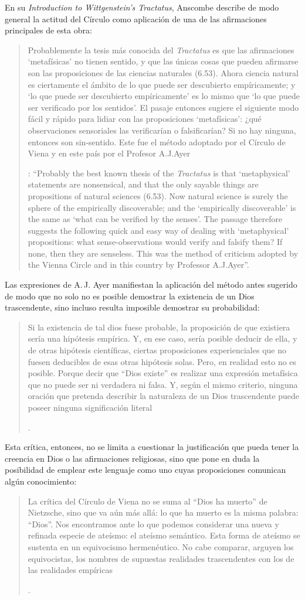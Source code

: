 En su \emph{Introduction to Wittgenstein's Tractatus}, Anscombe describe de modo general la actitud del Círculo como aplicación de una de las afirmaciones principales de esta obra: \blockquote[{\Cite[150]{anscombe1959iwt}}: \enquote{Probably the best known thesis of the \emph{Tractatus} is that `metaphysical' statements are nonsensical, and that the only sayable things are propositions of natural sciences (6.53). Now natural science is surely the sphere of the empirically discoverable; and the `empirically discoverable' is the same as `what can be verified by the senses'. The passage therefore suggests the following quick and easy way of dealing with `metaphysical' propositions: what sense-observations would verify and falsify them? If none, then they are senseless. This was the method of criticism adopted by the Vienna Circle and in this country by Professor A.J.Ayer}.]{Probablemente la tesis más conocida del \emph{Tractatus} es que las afirmaciones `metafísicas' no tienen sentido, y que las únicas cosas que pueden afirmarse son las proposiciones de las ciencias naturales (6.53). Ahora ciencia natural es ciertamente el ámbito de lo que puede ser descubierto empíricamente; y `lo que puede ser descubierto empíricamente' es lo mismo que `lo que puede ser verificado por los sentidos'. El pasaje entonces sugiere el siguiente modo fácil y rápido para lidiar con las proposiciones `metafísicas': ¿qué observaciones sensoriales las verificarían o falsificarían? Si no hay ninguna, entonces son sin-sentido. Este fue el método adoptado por el Círculo de Viena y en este país por el Profesor A.J.Ayer}.

Las expresiones de A.\,J. Ayer manifiestan la aplicación del método antes sugerido de modo que no solo no es posible demostrar la existencia de un Dios trascendente, sino incluso resulta imposible demostrar su probabilidad: \blockquote[{\Cite[Cf.][155]{dominguez2009at}}.]{Si la existencia de tal dios fuese probable, la proposición de que existiera sería una hipótesis empírica. Y, en ese caso, sería posible deducir de ella, y de otras hipótesis científicas, ciertas proposiciones experienciales que no fuesen deducibles de esas otras hipótesis solas. Pero, en realidad esto no es posible. \textelp{} Porque decir que ``Dios existe'' es realizar una expresión metafísica que no puede ser ni verdadera ni falsa. Y, según el mismo criterio, ninguna oración que pretenda describir la naturaleza de un Dios trascendente puede poseer ninguna significación literal}. Esta crítica, entonces, no se limita a cuestionar la justificación que pueda tener la creencia en Dios o las afirmaciones religiosas, sino que pone en duda la posibilidad de emplear este lenguaje como uno cuyas proposiciones comunican algún conocimiento: \blockquote[{\Cite[155]{dominguez2009at}}.]{La crítica del Círculo de Viena no se suma al ``Dios ha muerto'' de Nietzsche, sino que va aún más allá: lo que ha muerto es la misma palabra: ``Dios''. Nos encontramos ante lo que podemos considerar una nueva y refinada especie de ateísmo: el ateísmo semántico. Esta forma de ateísmo se sustenta en un equivocismo hermenéutico. No cabe comparar, arguyen los equivocistas, los nombres de supuestas realidades trascendentes con los de las realidades empíricas}.

